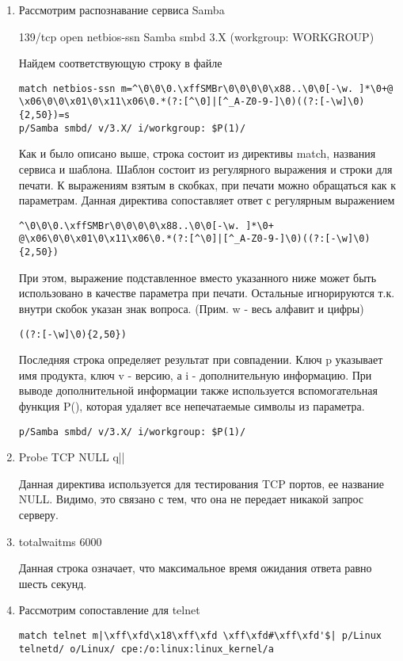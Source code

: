 \documentclass{article}
\begin{document}
\begin{enumerate}
\item Рассмотрим распознавание сервиса Samba

139/tcp  open  netbios-ssn Samba smbd 3.X (workgroup: WORKGROUP)

Найдем соответствующую строку в файле
\begin{verbatim}
match netbios-ssn m=^\0\0\0.\xffSMBr\0\0\0\0\x88..\0\0[-\w. ]*\0+@
\x06\0\0\x01\0\x11\x06\0.*(?:[^\0]|[^_A-Z0-9-]\0)((?:[-\w]\0){2,50})=s 
p/Samba smbd/ v/3.X/ i/workgroup: $P(1)/
\end{verbatim}
Как и было описано выше, строка состоит из директивы match, названия сервиса и шаблона. Шаблон состоит из регулярного выражения и строки для печати. К выражениям взятым в скобках, при печати можно обращаться как к параметрам. Данная директива сопоставляет ответ с регулярным выражением  
\begin{verbatim}
^\0\0\0.\xffSMBr\0\0\0\0\x88..\0\0[-\w. ]*\0+
@\x06\0\0\x01\0\x11\x06\0.*(?:[^\0]|[^_A-Z0-9-]\0)((?:[-\w]\0){2,50})
\end{verbatim}
При этом, выражение подставленное вместо указанного ниже может быть использовано в качестве параметра при печати. Остальные игнорируются т.к. внутри скобок указан знак вопроса. (Прим. w - весь алфавит и цифры)
\begin{verbatim}
((?:[-\w]\0){2,50})
\end{verbatim}
Последняя строка определяет результат при совпадении. Ключ p указывает имя продукта, ключ v - версию, а i - дополнительную информацию. При выводе дополнительной информации также используется вспомогательная функция P(), которая удаляет все непечатаемые символы из параметра.
\begin{verbatim}
p/Samba smbd/ v/3.X/ i/workgroup: $P(1)/
\end{verbatim}

\item Probe TCP NULL q||

Данная директива используется для тестирования TCP портов, ее название NULL. Видимо, это связано с тем, что она не передает никакой запрос серверу.

\item totalwaitms 6000

Данная строка означает, что максимальное время ожидания ответа равно шесть секунд.

\item Рассмотрим сопоставление для telnet
\begin{verbatim}
match telnet m|\xff\xfd\x18\xff\xfd \xff\xfd#\xff\xfd'$| p/Linux 
telnetd/ o/Linux/ cpe:/o:linux:linux_kernel/a
\end{verbatim}


\end{enumerate}
\end{document}
